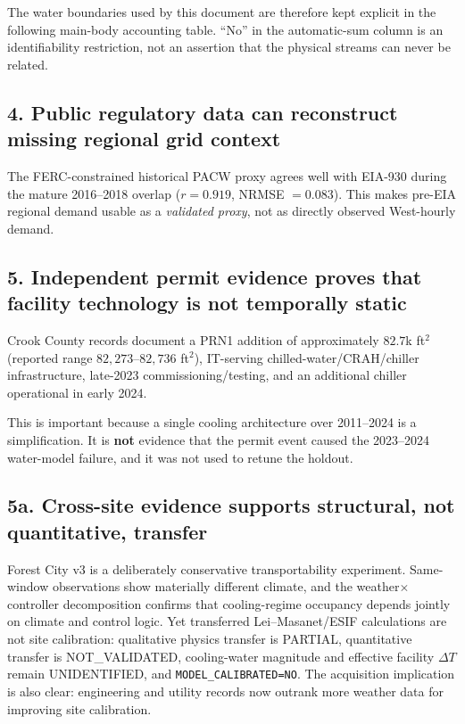 \documentclass[11pt]{article}
\newcommand{\latesttxt}[1]{\textcolor{purple!85!black}{#1}}
\begin{document}
{\color{purple!85!black}

}

\latesttxt{The water boundaries used by this document are therefore kept explicit in the following main-body accounting table. ``No'' in the automatic-sum column is an identifiability restriction, not an assertion that the physical streams can never be related.}

{\color{purple!85!black}

}

\subsection*{4. Public regulatory data can reconstruct missing regional grid context}

The FERC-constrained historical PACW proxy agrees well with EIA-930 during the mature 2016--2018 overlap ($r=0.919$, NRMSE $=0.083$). This makes pre-EIA regional demand usable as a \emph{validated proxy}, not as directly observed West-hourly demand.

\subsection*{5. Independent permit evidence proves that facility technology is not temporally static}

Crook County records document a PRN1 addition of approximately \(82.7\)k ft\(^2\) (reported range \(82{,}273\)--\(82{,}736\) ft\(^2\)), IT-serving chilled-water/CRAH/chiller infrastructure, late-2023 commissioning/testing, and an additional chiller operational in early 2024.

This is important because a single cooling architecture over 2011--2024 is a simplification. It is \textbf{not} evidence that the permit event caused the 2023--2024 water-model failure, and it was not used to retune the holdout.

\subsection*{\latesttxt{5a. Cross-site evidence supports structural, not quantitative, transfer}}

\latesttxt{Forest City v3 is a deliberately conservative transportability experiment. Same-window observations show materially different climate, and the weather\(\times\)controller decomposition confirms that cooling-regime occupancy depends jointly on climate and control logic. Yet transferred Lei--Masanet/ESIF calculations are not site calibration: qualitative physics transfer is PARTIAL, quantitative transfer is NOT\_VALIDATED, cooling-water magnitude and effective facility \(\Delta T\) remain UNIDENTIFIED, and \texttt{MODEL\_CALIBRATED=NO}. The acquisition implication is also clear: engineering and utility records now outrank more weather data for improving site calibration.}
\end{document}
